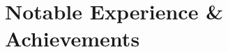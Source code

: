 \documentclass[10pt,a4paper]{moderncv}
\begin{document}
\maketitle

\section{Notable Experience \& Achievements}
\end{document}
